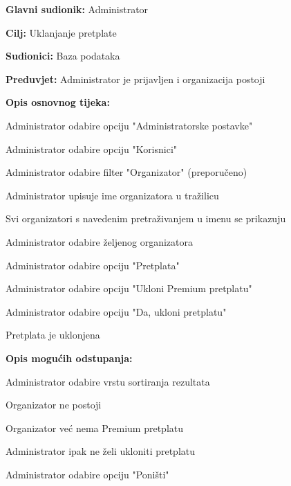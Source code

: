 					\noindent {}
					\begin{packed_item}
	
						\item \textbf{Glavni sudionik:} Administrator
						\item  \textbf{Cilj:} Uklanjanje pretplate
						\item  \textbf{Sudionici:} Baza podataka
						\item  \textbf{Preduvjet:} Administrator je prijavljen i organizacija postoji
						\item  \textbf{Opis osnovnog tijeka:}
						
						\item[] \begin{packed_enum}
	
							\item Administrator odabire opciju "Administratorske postavke"
							\item Administrator odabire opciju "Korisnici"
							\item Administrator odabire filter "Organizator" (preporučeno)
							\item Administrator upisuje ime organizatora u tražilicu
							\item Svi organizatori s navedenim pretraživanjem u imenu se prikazuju
							\item Administrator odabire željenog organizatora
							\item Administrator odabire opciju "Pretplata"
							\item Administrator odabire opciju "Ukloni Premium pretplatu"
							\item Administrator odabire opciju "Da, ukloni pretplatu"
							\item Pretplata je uklonjena
						\end{packed_enum}
						
						\item  \textbf{Opis mogućih odstupanja:}
						
						\item[] \begin{packed_item}
	
							\item[3.b] Administrator odabire vrstu sortiranja rezultata
							\item[5.a] Organizator ne postoji
							\item[8.a] Organizator već nema Premium pretplatu
							\item[9.a] Administrator ipak ne želi ukloniti pretplatu
							\item[] \begin{packed_enum}
								
								\item Administrator odabire opciju "Poništi"
								
							\end{packed_enum}
						\end{packed_item}
					\end{packed_item}

